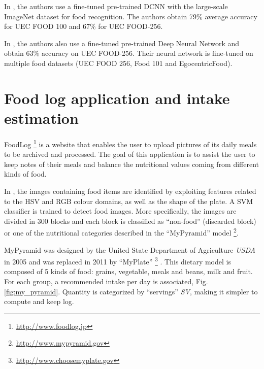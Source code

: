 
In \cite{Yanai2015}, the authors use a fine-tuned pre-trained DCNN with the large-scale ImageNet dataset for food recognition. The authors obtain 79\% average accuracy for UEC FOOD 100 and 67\% for UEC FOOD-256.

In \cite{Bolanos2016}, the authors also use a fine-tuned pre-trained Deep Neural Network and obtain 63\% accuracy on UEC FOOD-256. Their neural network is fine-tuned on multiple food datasets (UEC FOOD 256, Food 101 and EgocentricFood).

\section{Food log application and intake estimation}


FoodLog \footnote{\url{http://www.foodlog.jp}} is a website that enables the user to upload pictures of its daily meals to be archived and processed. The goal of this application is to assist the user to keep notes of their meals and balance the nutritional values coming from different kinds of food.

In \cite{Kitamura2008}, the images containing food items are identified by exploiting features related to the HSV and RGB colour domains, as well as the shape of the plate. A SVM classifier is trained to detect food images. More specifically, the images are divided in 300 blocks and each block is classified as \enquote{non-food} (discarded block) or one of the nutritional categories described in the \enquote{MyPyramid} model \footnote{\url{http://www.mypyramid.gov}}.

MyPyramid \cite{MyPyramid} was designed by the United State Department of Agriculture \textit{USDA} in 2005 and was replaced in 2011 by \enquote{MyPlate} \footnote{\url{http://www.choosemyplate.gov}} \cite{MyPlate}. This dietary model is composed of 5 kinds of food: grains, vegetable, meals and beans, milk and fruit. For each group, a recommended intake per day is associated, Fig. \ref{fig:my_pyramid}. Quantity is categorized by \enquote{servings} \textit{SV}, making it simpler to compute and keep log.

